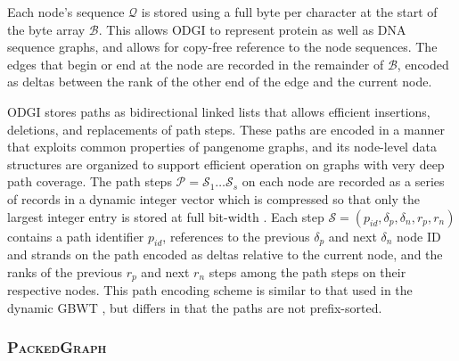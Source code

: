 \documentclass{bioinfo}
\begin{document}
\begin{methods}
Each node's sequence $\mathcal{Q}$ is stored using a full byte per character at the start of the byte array $\mathcal{B}$.
This allows \textsc{ODGI} to represent protein as well as DNA sequence graphs, and allows for copy-free reference to the node sequences. %
The edges that begin or end at the node are recorded in the remainder of $\mathcal{B}$, encoded as deltas between the rank of the other end of the edge and the current node. 

\textsc{ODGI} stores paths as bidirectional linked lists that allows efficient insertions, deletions, and replacements of path steps.
These paths are encoded in a manner that exploits common properties of pangenome graphs, and its node-level data structures are organized to support efficient operation on graphs with very deep path coverage.
The path steps $\mathcal{P} = \mathcal{S}_1 \ldots \mathcal{S}_{s}$ on each node are recorded as a series of records in a dynamic integer vector which is compressed so that only the largest integer entry is stored at full bit-width \citep{prezza2017framework}.
Each step $\mathcal{S} = (p_{id}, \delta_p, \delta_n, r_p, r_n)$ contains a path identifier $p_{id}$, references to the previous $\delta_p$ and next $\delta_n$ node ID and strands on the path encoded as deltas relative to the current node, and the ranks of the previous $r_p$ and next $r_n$ steps among the path steps on their respective nodes.
This path encoding scheme is similar to that used in the dynamic GBWT \citep{Siren_2019}, but differs in that the paths are not prefix-sorted.





\subsubsection{\textsc{PackedGraph}}


\end{methods}
\end{document}
